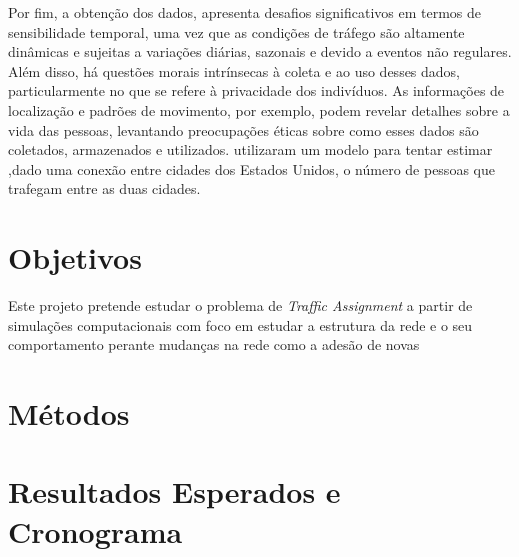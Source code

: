 \documentclass{article}
\begin{document}

Por fim, a obtenção dos dados, apresenta desafios significativos em termos de sensibilidade temporal, uma vez que as condições de tráfego são altamente dinâmicas e sujeitas a variações diárias, sazonais e devido a eventos não regulares. Além disso, há questões morais intrínsecas à coleta e ao uso desses dados, particularmente no que se refere à privacidade dos indivíduos. As informações de localização e padrões de movimento, por exemplo, podem revelar detalhes sobre a vida das pessoas, levantando preocupações éticas sobre como esses dados são coletados, armazenados e utilizados. \citet{Simini2012} utilizaram um modelo para tentar estimar ,dado uma conexão entre cidades dos Estados Unidos, o número de pessoas que trafegam entre as duas cidades.


\newpage
\section{Objetivos}

Este projeto pretende estudar o problema de \textit{Traffic Assignment} a partir de simulações computacionais com foco em estudar a estrutura da rede e o seu comportamento perante mudanças na rede como a adesão de novas 

\newpage

\section{Métodos}

\newpage

\section{Resultados Esperados e Cronograma}

\newpage


\end{document}
